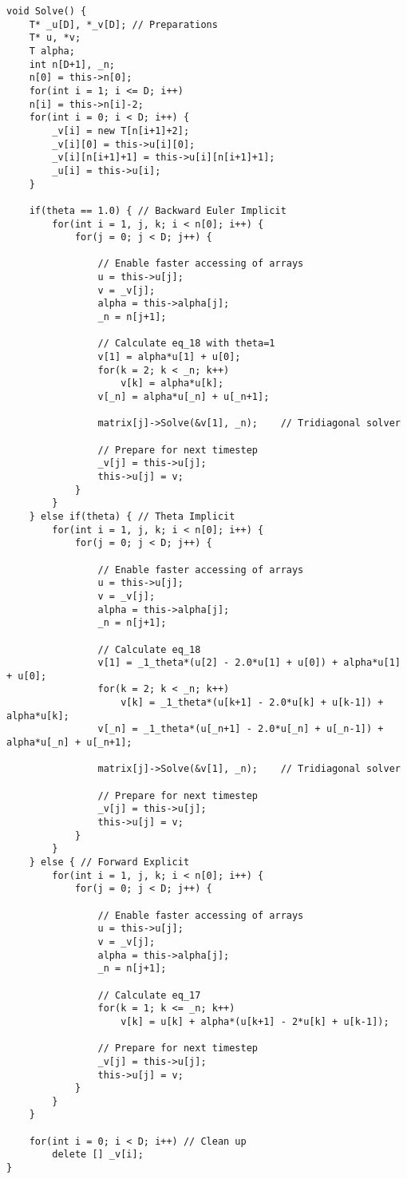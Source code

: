 \documentclass[11pt,english,a4paper]{article}
\begin{document}
\begin{flushleft}
\begin{lstlisting}[title={\texttt{HeatEquation::Solve()}}]
void Solve() {
	T* _u[D], *_v[D]; // Preparations
	T* u, *v;
	T alpha;
	int n[D+1], _n;
	n[0] = this->n[0];
	for(int i = 1; i <= D; i++)
	n[i] = this->n[i]-2;
	for(int i = 0; i < D; i++) {
		_v[i] = new T[n[i+1]+2];
		_v[i][0] = this->u[i][0];
		_v[i][n[i+1]+1] = this->u[i][n[i+1]+1];
		_u[i] = this->u[i];
	}
	
	if(theta == 1.0) { // Backward Euler Implicit
		for(int i = 1, j, k; i < n[0]; i++) {
			for(j = 0; j < D; j++) {
				
				// Enable faster accessing of arrays
				u = this->u[j];		
				v = _v[j];
				alpha = this->alpha[j];
				_n = n[j+1];
				
				// Calculate eq_18 with theta=1
				v[1] = alpha*u[1] + u[0];
				for(k = 2; k < _n; k++)
					v[k] = alpha*u[k];
				v[_n] = alpha*u[_n] + u[_n+1];
				
				matrix[j]->Solve(&v[1], _n);	// Tridiagonal solver
				
				// Prepare for next timestep
				_v[j] = this->u[j];
				this->u[j] = v;
			}
		}
	} else if(theta) { // Theta Implicit
		for(int i = 1, j, k; i < n[0]; i++) {
			for(j = 0; j < D; j++) {
			
				// Enable faster accessing of arrays
				u = this->u[j];
				v = _v[j];
				alpha = this->alpha[j];
				_n = n[j+1];
				
				// Calculate eq_18
				v[1] = _1_theta*(u[2] - 2.0*u[1] + u[0]) + alpha*u[1] + u[0];
				for(k = 2; k < _n; k++)
					v[k] = _1_theta*(u[k+1] - 2.0*u[k] + u[k-1]) + alpha*u[k];
				v[_n] = _1_theta*(u[_n+1] - 2.0*u[_n] + u[_n-1]) + alpha*u[_n] + u[_n+1];
				
				matrix[j]->Solve(&v[1], _n);	// Tridiagonal solver
				
				// Prepare for next timestep
				_v[j] = this->u[j];
				this->u[j] = v;
			}
		}
	} else { // Forward Explicit
		for(int i = 1, j, k; i < n[0]; i++) {
			for(j = 0; j < D; j++) {
			
				// Enable faster accessing of arrays
				u = this->u[j];
				v = _v[j];
				alpha = this->alpha[j];
				_n = n[j+1];
				
				// Calculate eq_17				
				for(k = 1; k <= _n; k++)
					v[k] = u[k] + alpha*(u[k+1] - 2*u[k] + u[k-1]);
					
				// Prepare for next timestep				
				_v[j] = this->u[j];
				this->u[j] = v;
			}
		}
	}
	
	for(int i = 0; i < D; i++) // Clean up
		delete [] _v[i];
}
\end{lstlisting}


\end{flushleft}
\end{document}
